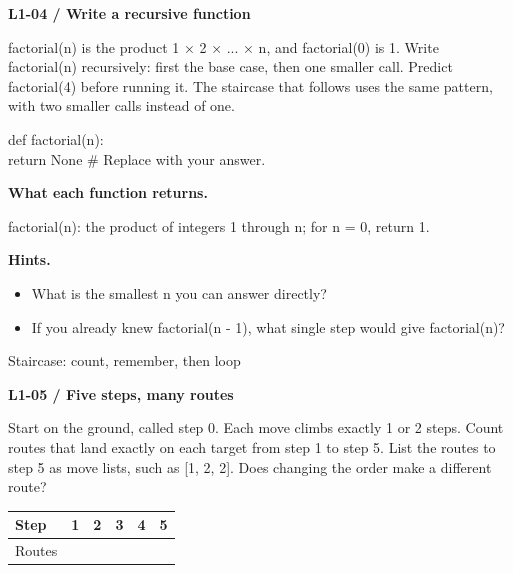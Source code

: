 \documentclass[11pt,a4paper]{article}
\begin{document}
\par\noindent\begin{minipage}{\linewidth}
\textbf{L1-04 / Write a recursive function}\par\smallskip factorial(n) is the product 1 × 2 × ... × n, and factorial(0) is 1. Write factorial(n) recursively: first the base case, then one smaller call. Predict factorial(4) before running it. The staircase that follows uses the same pattern, with two smaller calls instead of one.\par
\par{}\par\smallskip\noindent\colorbox{codepaper}{\parbox{\dimexpr\linewidth-2\fboxsep\relax}{\small\ttfamily\raggedright def factorial(n):\\\hspace*{2.4em}return None  \# Replace with your answer.}}\par
{\small\textbf{What each function returns.}\par factorial(n): the product of integers 1 through n; for n = 0, return 1.\par }
{\small\textbf{Hints.}}\begin{itemize}\item What is the smallest n you can answer directly?\item If you already knew factorial(n - 1), what single step would give factorial(n)?\end{itemize}
\end{minipage}\par\vspace{2mm}
\par\noindent\begin{minipage}{\linewidth}
{\heavy\fontsize{12}{15}\selectfont Staircase: count, remember, then loop\par}\medskip
\textbf{L1-05 / Five steps, many routes}\par\smallskip Start on the ground, called step 0. Each move climbs exactly 1 or 2 steps. Count routes that land exactly on each target from step 1 to step 5. List the routes to step 5 as move lists, such as [1, 2, 2]. Does changing the order make a different route?\par
\par\smallskip \begingroup\small\setlength{\tabcolsep}{4pt}\renewcommand{\arraystretch}{1.35}\begin{tabularx}{\linewidth}{>{\raggedright\arraybackslash}X>{\raggedright\arraybackslash}X>{\raggedright\arraybackslash}X>{\raggedright\arraybackslash}X>{\raggedright\arraybackslash}X>{\raggedright\arraybackslash}X}\toprule\textbf{Step} & \textbf{1} & \textbf{2} & \textbf{3} & \textbf{4} & \textbf{5}\\\midrule
Routes &  &  &  &  & \\
\bottomrule\end{tabularx}\endgroup\par\smallskip 
\end{minipage}\par\vspace{2mm}
\end{document}

